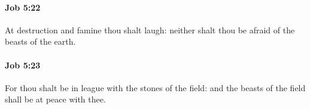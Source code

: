 		\paragraph{Job 5:22} %
			\label{JOB-5-22}

			At destruction and famine thou shalt laugh: neither shalt thou be afraid of the beasts of the earth.


		\paragraph{Job 5:23} %
			\label{JOB-5-23}

			For thou shalt be in league with the stones of the field: and the beasts of the field shall be at peace with thee.


